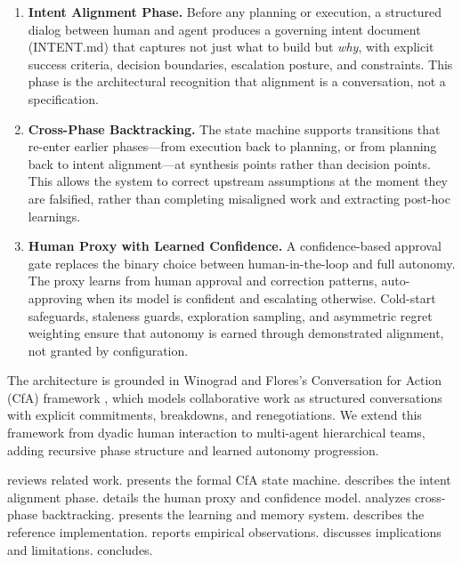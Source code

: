 \documentclass[11pt,a4paper]{article}
\begin{document}
\begin{enumerate}[label=(\arabic*)]
    \item \textbf{Intent Alignment Phase.} Before any planning or execution,
    a structured dialog between human and agent produces a governing intent
    document (INTENT.md) that captures not just what to build but \emph{why},
    with explicit success criteria, decision boundaries, escalation posture,
    and constraints. This phase is the architectural recognition that alignment
    is a conversation, not a specification.

    \item \textbf{Cross-Phase Backtracking.} The state machine supports
    transitions that re-enter earlier phases---from execution back to planning,
    or from planning back to intent alignment---at synthesis points rather than
    decision points. This allows the system to correct upstream assumptions at
    the moment they are falsified, rather than completing misaligned work and
    extracting post-hoc learnings.

    \item \textbf{Human Proxy with Learned Confidence.} A confidence-based
    approval gate replaces the binary choice between human-in-the-loop and
    full autonomy. The proxy learns from human approval and correction
    patterns, auto-approving when its model is confident and escalating
    otherwise. Cold-start safeguards, staleness guards, exploration sampling,
    and asymmetric regret weighting ensure that autonomy is earned through
    demonstrated alignment, not granted by configuration.
\end{enumerate}

The architecture is grounded in Winograd and Flores's Conversation for Action
(CfA) framework \citep{winograd1986understanding}, which models collaborative
work as structured conversations with explicit commitments, breakdowns, and
renegotiations. We extend this framework from dyadic human interaction to
multi-agent hierarchical teams, adding recursive phase structure and learned
autonomy progression.

 reviews related work.
 presents the formal CfA state machine.
 describes the intent alignment phase.
 details the human proxy and confidence model.
 analyzes cross-phase backtracking.
 presents the learning and memory system.
 describes the reference implementation.
 reports empirical observations.
 discusses implications and limitations.
 concludes.
\end{document}
